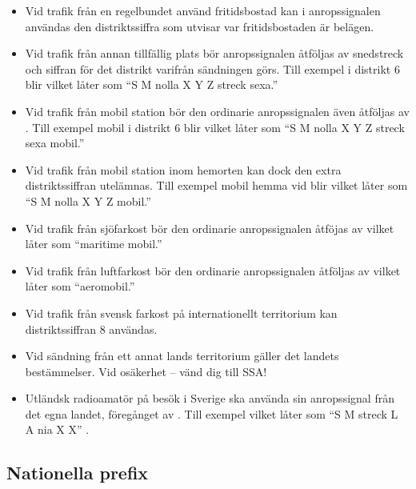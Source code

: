 \begin{itemize}
\item Vid trafik från en regelbundet använd fritidsbostad kan i
  anropssignalen användas den distriktssiffra som utvisar var
  fritidsbostaden är belägen.

\item Vid trafik från annan tillfällig plats bör anropssignalen
  åtföljas av snedstreck och siffran för det distrikt varifrån
  sändningen görs. Till exempel  i distrikt 6 blir 
  vilket låter som ``S M nolla X Y Z streck sexa.''

\item Vid trafik från mobil station bör den ordinarie anropssignalen
  även åtföljas av . Till exempel  mobil i distrikt 6 blir  vilket låter som ``S M nolla X Y Z streck sexa mobil.''

\item Vid trafik från mobil station inom hemorten kan dock den extra
  distriktssiffran utelämnas.  Till exempel  mobil hemma vid blir  vilket låter som ``S M nolla X Y Z mobil.''

\item Vid trafik från sjöfarkost bör den ordinarie anropssignalen
  åtföjas av  vilket låter som ``maritime mobil.''

\item Vid trafik från luftfarkost bör den ordinarie anropssignalen
  åtföljas av  vilket låter som ``aeromobil.''

\item Vid trafik från svensk farkost på internationellt territorium
 kan distriktssiffran 8 användas.

\item Vid sändning från ett annat lands territorium gäller det landets
  bestämmelser.
  Vid osäkerhet -- vänd dig till SSA!

\item Utländsk radioamatör på besök i Sverige ska använda sin
  anropssignal från det egna landet, föregånget av . Till exempel  vilket låter som ``S M streck L A nia X X'' \cite{TR6101}.
\end{itemize}

\subsection{Nationella prefix}

